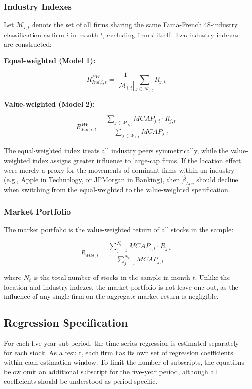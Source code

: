 \documentclass[
  12pt,
]{article}
\begin{document}
\subsubsection{Industry Indexes}\label{industry-indexes}

Let \(\mathcal{M}_{i,t}\) denote the set of all firms sharing the same
Fama-French 48-industry classification as firm \(i\) in month \(t\),
excluding firm \(i\) itself. Two industry indexes are constructed:

\textbf{Equal-weighted (Model 1):}

\[R_{Ind,i,t}^{EW} = \frac{1}{|\mathcal{M}_{i,t}|}\sum_{j \in \mathcal{M}_{i,t}} R_{j,t}\]

\textbf{Value-weighted (Model 2):}

\[R_{Ind,i,t}^{VW} = \frac{\sum_{j \in \mathcal{M}_{i,t}} MCAP_{j,t} \cdot R_{j,t}}{\sum_{j \in \mathcal{M}_{i,t}} MCAP_{j,t}}\]

\noindent The equal-weighted index treats all industry peers
symmetrically, while the value-weighted index assigns greater influence
to large-cap firms. If the location effect were merely a proxy for the
movements of dominant firms within an industry (e.g., Apple in
Technology, or JPMorgan in Banking), then \(\hat{\beta}_{Loc}\) should
decline when switching from the equal-weighted to the value-weighted
specification.

\subsubsection{Market Portfolio}\label{market-portfolio}

The market portfolio is the value-weighted return of all stocks in the
sample:

\[R_{Mkt,t} = \frac{\sum_{j=1}^{N_t} MCAP_{j,t} \cdot R_{j,t}}{\sum_{j=1}^{N_t} MCAP_{j,t}}\]

\noindent where \(N_t\) is the total number of stocks in the sample in
month \(t\). Unlike the location and industry indexes, the market
portfolio is not leave-one-out, as the influence of any single firm on
the aggregate market return is negligible.

\subsection{Regression Specification}\label{regression-specification}

For each five-year sub-period, the time-series regression is estimated
separately for each stock. As a result, each firm has its own set of
regression coefficients within each estimation window. To limit the
number of subscripts, the equations below omit an additional subscript
for the five-year period, although all coefficients should be understood
as period-specific.
\end{document}
